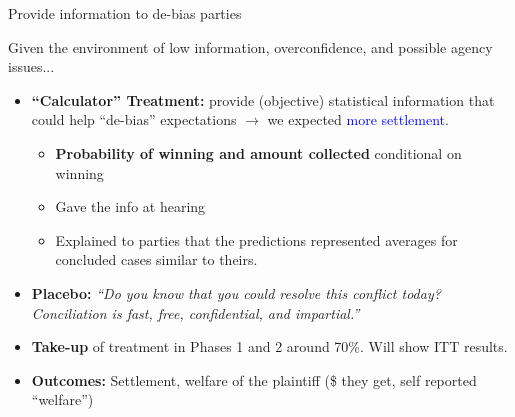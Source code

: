 \documentclass[9pt]{beamer}
\begin{document}

\begin{frame}{Provide information to de-bias parties}

    Given the environment of low information, overconfidence, and possible agency issues...
        \vspace{0.1in}
        
    \begin{itemize}
        \item \textbf{``Calculator'' Treatment:} provide (objective) statistical information that could help ``de-bias'' expectations $\rightarrow$ we expected  \textcolor{blue}{more settlement}.
          \begin{itemize}
              \vspace{.05in}
              \item \textbf{Probability of winning and amount collected} conditional on winning
              \vspace{.05in}
              \item Gave the info at hearing
                  \vspace{.05in}
                  \item Explained to parties that the predictions represented averages for concluded cases similar to theirs.

              
          \end{itemize}
        \vspace{0.1in}
        \pause
        \item \textbf{Placebo:} \textit{``Do you know that you could resolve this conflict today? Conciliation is fast, free, confidential,
and impartial.''}
        \vspace{0.1in}
        \pause
        \item \textbf{Take-up} of treatment in Phases 1 and 2 around 70\%. Will show ITT results.
           \vspace{0.1in}
        \item \textbf{Outcomes:} Settlement, welfare of the plaintiff (\$ they get, self reported ``welfare'') 
    \end{itemize}
\end{frame}
\end{document}
